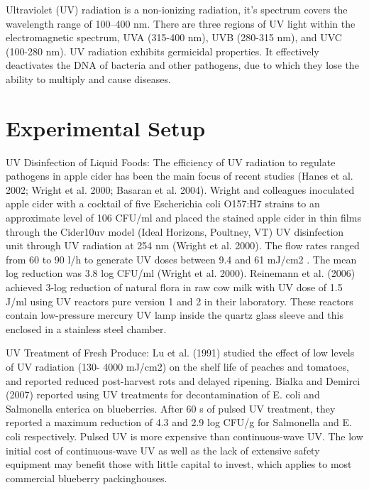 \documentclass[journal]{IEEEtran}
\begin{document}
 Ultraviolet (UV) radiation is a non-ionizing radiation, it's spectrum covers the wavelength range of 100–400 nm. There are three regions of UV light within the electromagnetic spectrum, UVA (315-400 nm), UVB (280-315 nm), and UVC (100-280 nm). UV radiation exhibits germicidal properties. It effectively deactivates the DNA of bacteria and other pathogens, due to which they lose the ability to multiply and cause diseases.

\section{Experimental Setup}

\b{ UV Disinfection of Liquid Foods}:
The efficiency of UV radiation to regulate pathogens in apple cider has been the main focus of recent studies (Hanes et al. 2002;
Wright et al. 2000; Basaran et al. 2004). Wright and colleagues
inoculated apple cider with a cocktail of five Escherichia coli
O157:H7 strains to an approximate level of 106 CFU/ml and
placed the stained apple cider in thin films through the Cider10uv model (Ideal Horizons, Poultney, VT) UV disinfection
unit through UV radiation at 254 nm (Wright et al. 2000).
The flow rates ranged from 60 to 90 l/h to generate UV doses
between 9.4 and 61 mJ/cm2 . The mean log reduction was
3.8 log CFU/ml (Wright et al. 2000). Reinemann et al. (2006)
achieved 3-log reduction of natural flora in raw cow milk with UV dose of 1.5 J/ml using UV reactors pure version 1 and 2 in
their laboratory. These reactors contain low-pressure mercury
UV lamp inside the quartz glass sleeve and this enclosed in a
stainless steel chamber.


\vspace{5mm} %

UV Treatment of Fresh Produce:
Lu et al. (1991) studied the effect of low levels of UV radiation (130-
4000 mJ/cm2) on the shelf life of peaches and tomatoes,
and reported reduced post-harvest rots and delayed ripening.
Bialka and Demirci (2007) reported using UV treatments
for decontamination of E. coli and Salmonella enterica on
blueberries. After 60 s of pulsed UV treatment, they reported a
maximum reduction of 4.3 and 2.9 log CFU/g for Salmonella
and E. coli respectively. Pulsed UV is more expensive than
continuous-wave UV. The low initial cost of continuous-wave
UV as well as the lack of extensive safety equipment may
benefit those with little capital to invest, which applies to most
commercial blueberry packinghouses.
\end{document}
